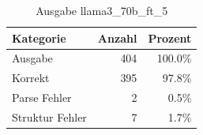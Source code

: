 
\begin{table}[!ht]
\centering
\begin{tabular}{lrr}
\toprule
\textbf{Kategorie} & \textbf{Anzahl} & \textbf{Prozent} \\
\midrule
Ausgabe & 404 & 100.0\% \\
Korrekt & 395 & 97.8\% \\
Parse Fehler & 2 & 0.5\% \\
Struktur Fehler & 7 & 1.7\% \\
\bottomrule
\end{tabular}
\caption{Ausgabe llama3_70b_ft_5}
\label{tab:file_counts}
\end{table}
    